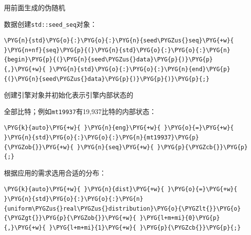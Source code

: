 
用前面生成的伪随机



数据创建\texttt{std::\allowbreak{}seed\_\allowbreak{}seq}对象：



\begin{codeblockbg}
\begin{Verbatim}[commandchars=\\\{\},breaklines=true,breakanywhere=true,fontsize=\codefont,xleftmargin=17bp]
\PYG{n}{std}\PYG{o}{:}\PYG{o}{:}\PYG{n}{seed\PYGZus{}seq}\PYG{+w}{ }\PYG{n+nf}{seq}\PYG{p}{(}\PYG{n}{std}\PYG{o}{:}\PYG{o}{:}\PYG{n}{begin}\PYG{p}{(}\PYG{n}{seed\PYGZus{}data}\PYG{p}{)}\PYG{p}{,}\PYG{+w}{ }\PYG{n}{std}\PYG{o}{:}\PYG{o}{:}\PYG{n}{end}\PYG{p}{(}\PYG{n}{seed\PYGZus{}data}\PYG{p}{)}\PYG{p}{)}\PYG{p}{;}
\end{Verbatim}
\end{codeblockbg}



创建引擎对象并初始化表示引擎内部状态的



全部比特；例如\texttt{mt19937}有19,937比特的内部状态：



\begin{codeblockbg}
\begin{Verbatim}[commandchars=\\\{\},breaklines=true,breakanywhere=true,fontsize=\codefont,xleftmargin=17bp]
\PYG{k}{auto}\PYG{+w}{ }\PYG{n}{eng}\PYG{+w}{ }\PYG{o}{=}\PYG{+w}{ }\PYG{n}{std}\PYG{o}{:}\PYG{o}{:}\PYG{n}{mt19937}\PYG{p}{\PYGZob{}}\PYG{+w}{ }\PYG{n}{seq}\PYG{+w}{ }\PYG{p}{\PYGZcb{}}\PYG{p}{;}
\end{Verbatim}
\end{codeblockbg}


根据应用的需求选用合适的分布：



\begin{codeblockbg}
\begin{Verbatim}[commandchars=\\\{\},breaklines=true,breakanywhere=true,fontsize=\codefont,xleftmargin=17bp]
\PYG{k}{auto}\PYG{+w}{ }\PYG{n}{dist}\PYG{+w}{ }\PYG{o}{=}\PYG{+w}{ }\PYG{n}{std}\PYG{o}{:}\PYG{o}{:}\PYG{n}{uniform\PYGZus{}real\PYGZus{}distribution}\PYG{o}{\PYGZlt{}}\PYG{o}{\PYGZgt{}}\PYG{p}{\PYGZob{}}\PYG{+w}{ }\PYG{l+m+mi}{0}\PYG{p}{,}\PYG{+w}{ }\PYG{l+m+mi}{1}\PYG{+w}{ }\PYG{p}{\PYGZcb{}}\PYG{p}{;}
\end{Verbatim}
\end{codeblockbg}



